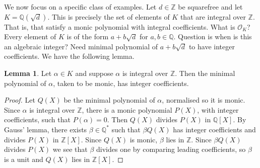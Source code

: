 \documentclass{article}
\newcommand{\Z}{\mathbb{Z}}
\newcommand{\Q}{\mathbb{Q}}
\newcommand{\rb}[1]{\left( #1 \right)}
\renewcommand{\sb}[1]{\left[ #1 \right]}
\theoremstyle{definition}\newtheorem{definition}{Definition}[subsection]
\theoremstyle{definition}\newtheorem{remark}[definition]{Remark}
\theoremstyle{definition}\newtheorem*{example}{Example}
\theoremstyle{definition}\newtheorem*{note}{Note}
\newtheorem{lemma}[definition]{Lemma}
\begin{document}
We now focus on a specific class of examples. Let $ d \in \Z $ be squarefree and let $ K = \Q\rb{\sqrt{d}} $. This is precisely the set of elements of $ K $ that are integral over $ \Z $. That is, that satisfy a monic polynomial with integral coefficients. What is $ \mathcal{O}_K $? Every element of $ K $ is of the form $ a + b\sqrt{d} $ for $ a, b \in \Q $. Question is when is this an algebraic integer? Need minimal polynomial of $ a + b\sqrt{d} $ to have integer coefficients. We have the following lemma.

\begin{lemma}
Let $ \alpha \in K $ and suppose $ \alpha $ is integral over $ \Z $. Then the minimal polynomial of $ \alpha $, taken to be monic, has integer coefficients.
\end{lemma}

\begin{proof}
Let $ Q\rb{X} $ be the minimal polynomial of $ \alpha $, normalised so it is monic. Since $ \alpha $ is integral over $ \Z $, there is a monic polynomial $ P\rb{X} $, with integer coefficients, such that $ P\rb{\alpha} = 0 $. Then $ Q\rb{X} $ divides $ P\rb{X} $ in $ \Q\sb{X} $. By Gauss' lemma, there exists $ \beta \in \Q^* $ such that $ \beta Q\rb{X} $ has integer coefficients and divides $ P\rb{X} $ in $ \Z\sb{X} $. Since $ Q\rb{X} $ is monic, $ \beta $ lies in $ \Z $. Since $ \beta Q\rb{X} $ divides $ P\rb{X} $ we see that $ \beta $ divides one by comparing leading coefficients, so $ \beta $ is a unit and $ Q\rb{X} $ lies in $ \Z\sb{X} $.
\end{proof}
\end{document}
